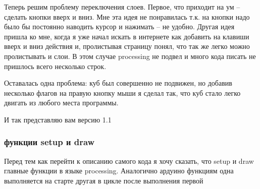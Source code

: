 \documentclass[a4paper, 12pt]{article}
\begin{document}

Теперь решим проблему переключения слоев. Первое, что приходит на ум -- сделать
кнопки вверх и вниз. Мне эта идея не понравилась т.к. на кнопки надо было бы
постоянно наводить курсор и нажимать -- не удобно. Другая идея пришла ко мне,
когда я уже начал искать в интернете как добавить на клавиши вверх и вниз
действия и, пролистывая страницу понял, что так же легко можно пролистывать и
слои. В этом случае processing не подвел и много кода писать не пришлось всего
несколько строк.

Оставалась одна проблема: куб был совершенно не подвижен, но добавив несколько
флагов на правую кнопку мыши я сделал так, что куб стало легко двигать из
любого места программы.


И так представляю вам версию 1.1

\subsubsection{функции setup и draw}

Перед тем как перейти к описанию самого кода я хочу сказать, что setup и draw
главные функции в языке processing. Аналогично ардуино функциям одна
выполняется на старте другая в цикле после выполнения первой
\end{document}

